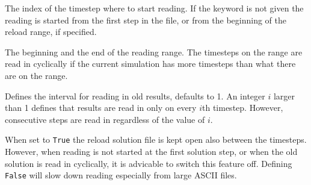 The index of the timestep where to start reading. If the keyword is
not given the reading is started from the first step in the file, or
from the beginning of the reload range, if specified.

The beginning and the end of the reading range. The timesteps on the
range are read in cyclically if the current simulation has
more timesteps than what there are on the range. 

Defines the interval for reading in old results, defaults to 1. An
integer $i$ larger than 1 defines that results are read in only on
every $i$th timestep. However, consecutive steps are read in
regardless of the value of $i$.

When set to {\tt True} the reload solution file is kept open also between
the timesteps. However, when reading is not started at the first
solution step, or when the old solution is read in cyclically, it is
advicable to switch this feature off. Defining {\tt False} will slow down
reading especially from large ASCII files. 
\sifend
\sifend

